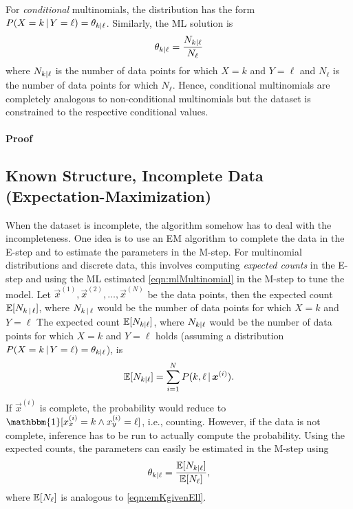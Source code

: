 				For \emph{conditional} multinomials, the distribution has the form \( P(X = k \,\vert\, Y = \ell) = \theta_{k \vert \ell} \). Similarly, the ML solution is
				\begin{equation}
					\theta_{k \vert \ell} = \frac{N_{k \vert \ell}}{N_{\ell}}  \label{eqn:mlMultinomial}
				\end{equation}
				where \( N_{k \vert \ell} \) is the number of data points for which \( X = k \) and \( Y = \ell \) and \( N_{\ell} \) is the number of data points for which \( N_{\ell} \). Hence, conditional multinomials are completely analogous to non-conditional multinomials but the dataset is constrained to the respective conditional values.

				\paragraph{Proof}

		\subsection{Known Structure, Incomplete Data (Expectation-Maximization)}
			When the dataset is incomplete, the algorithm somehow has to deal with the incompleteness. One idea is to use an EM algorithm to complete the data in the E-step and to estimate the parameters in the M-step. For multinomial distributions and discrete data, this involves computing \emph{expected counts} in the E-step and using the ML estimated \eqref{eqn:mlMultinomial} in the M-step to tune the model. Let \( \vec{x}^{(1)}, \vec{x}^{(2)}, \dots, \vec{x}^{(N)} \) be the data points, then the expected count \( \mathbb{E}[N_{k \,\vert\, \ell}] \), where \( N_{k \,\vert\, \ell} \) would be the number of data points for which \(X = k\) and \(Y = \ell\)
			The expected count \( \mathbb{E}[N_{k \vert \ell}] \), where \( N_{k \vert \ell} \) would be the number of data points for which \(X = k\) and \(Y = \ell\) holds (assuming a distribution \( P(X = k \,\vert\, Y = \ell) = \theta_{k \vert \ell} \)), is
			\begin{equation}
				\mathbb{E}[N_{k \vert \ell}] = \sum_{i = 1}^{N} P(k, \ell \,\vert\, \bm{x}^{(i)}).  \label{eqn:emKgivenEll}
			\end{equation}
			If \( \vec{x}^{(i)} \) is complete, the probability would reduce to \( \mathbbm{1}[x^{(i)}_x = k \land x^{(i)}_y = \ell] \), i.e., counting. However, if the data is not complete, inference has to be run to actually compute the probability. Using the expected counts, the parameters can easily be estimated in the M-step using
			\begin{equation}
				\theta_{k \vert \ell} = \frac{\mathbb{E}[N_{k \vert \ell}]}{\mathbb{E}[N_{\ell}]},
			\end{equation}
			where \( \mathbb{E}[N_{\ell}] \) is analogous to \eqref{eqn:emKgivenEll}.

